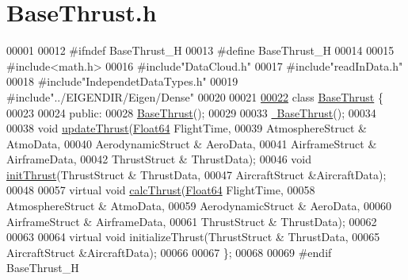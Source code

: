 \hypertarget{_base_thrust_8h_source}{}\section{Base\+Thrust.\+h}
\label{_base_thrust_8h_source}

\begin{DoxyCode}
00001 
00012 \textcolor{preprocessor}{#ifndef BaseThrust\_H}
00013 \textcolor{preprocessor}{#define BaseThrust\_H}
00014 
00015 \textcolor{preprocessor}{#include<math.h>}
00016 \textcolor{preprocessor}{#include"DataCloud.h"}
00017 \textcolor{preprocessor}{#include"readInData.h"}
00018 \textcolor{preprocessor}{#include"IndependetDataTypes.h"}
00019 \textcolor{preprocessor}{#include"../EIGENDIR/Eigen/Dense"}
00020 
00021 
\hyperlink{group___engine}{00022} \textcolor{keyword}{class }\hyperlink{group___engine_class_base_thrust}{BaseThrust} \{
00023 
00024 \textcolor{keyword}{public}:
00028     \hyperlink{group___engine_a19885a6a70bfc4c02e2d8f310af9f22e}{BaseThrust}();
00029 
00033     \hyperlink{group___engine_a554955351c2acfe7a46c00fe056c5c6c}{~BaseThrust}();
00034 
00038     \textcolor{keywordtype}{void} \hyperlink{group___engine_a869359a1b2b7cddcbe5979d6a1cf5eac}{updateThrust}(\hyperlink{group___tools_ga3f1431cb9f76da10f59246d1d743dc2c}{Float64} FlightTime,
00039                         AtmosphereStruct & AtmoData,
00040                         AerodynamicStruct & AeroData,
00041                         AirframeStruct & AirframeData,
00042                         ThrustStruct & ThrustData);
00046     \textcolor{keywordtype}{void} \hyperlink{group___engine_a02b3fe7f763d84c5d34b59f124eaf455}{initThrust}(ThrustStruct & ThrustData,
00047                     AircraftStruct &AircraftData);
00048 
00057     \textcolor{keyword}{virtual} \textcolor{keywordtype}{void} \hyperlink{group___engine_ac578e683598739655ce52ea85d97362b}{calcThrust}(\hyperlink{group___tools_ga3f1431cb9f76da10f59246d1d743dc2c}{Float64} FlightTime,
00058                             AtmosphereStruct & AtmoData,
00059                             AerodynamicStruct & AeroData,
00060                             AirframeStruct & AirframeData,
00061                             ThrustStruct & ThrustData);
00062 
00063 
00064     \textcolor{keyword}{virtual} \textcolor{keywordtype}{void} initializeThrust(ThrustStruct & ThrustData,
00065                                   AircraftStruct &AircraftData);
00066 
00067 \};
00068 
00069 \textcolor{preprocessor}{#endif  BaseThrust\_H}
\end{DoxyCode}
